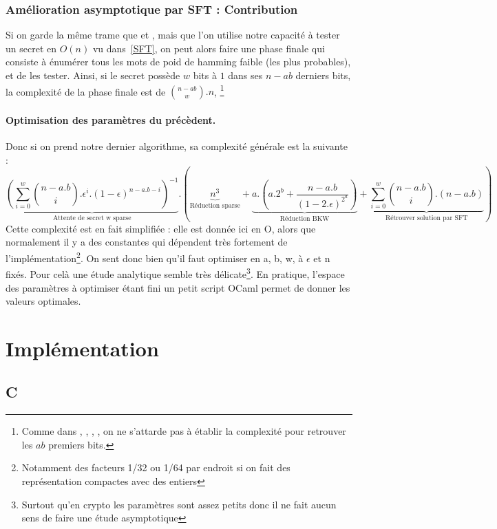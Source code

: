 \documentclass{article}		%
\theoremstyle{definition}
\theoremstyle{plain}
\begin{document}
\subsubsection{Amélioration asymptotique par SFT : Contribution}
\cite{Vaudenay}
Si on garde la même trame que \cite{Kirchner} et \cite{Bernstein}, mais que l'on utilise notre
capacité à tester un secret en $O(n)$ vu dans~\ref{SFT}, on peut alors faire une phase
finale qui consiste à énumérer tous les mots de poid de hamming faible (les plus
probables), et de les tester. Ainsi, si le secret possède $w$ bits à $1$
dans ses $n-ab$ derniers bits,
la complexité de la phase finale est de $\binom{n-ab}{w}.n$, \footnote{Comme dans
\cite{LF}, \cite{BKW}, \cite{Kirchner}, \cite{Bernstein}, on ne s'attarde
pas à établir la complexité pour retrouver les $ab$ premiers bits.}

\paragraph{Optimisation des paramètres du précèdent.}
Donc si on prend notre dernier algorithme, sa complexité générale est
la suivante :
$$\underbrace{(\sum_{i=0}^{w}\binom{n-a.b}{i}.\epsilon^i.(1-\epsilon)^{n-a.b-i})^{-1}}_{\text{Attente
de secret w sparse}}.
(\underbrace{n^3}_{\text{Réduction sparse}} +
\underbrace{a.(a.2^b+\frac{n-a.b}{(1-2.\epsilon)^{2^a}})
}_{\text{Réduction BKW}} + \underbrace{\sum_{i=0}^w \binom{n-a.b}{i}.(n-a.b)}_{\text{Rétrouver solution par SFT}} )$$ 
Cette complexité est en fait simplifiée : elle est donnée ici en O, alors
que normalement il y a des constantes qui dépendent très fortement de
l'implémentation\footnote{Notamment des facteurs 1/32 ou 1/64 par
endroit si on fait des représentation compactes avec des entiers}. On sent
donc bien qu'il faut optimiser en a, b, w, à $\epsilon$ et n fixés. Pour
celà une étude analytique semble très délicate\footnote{Surtout qu'en
crypto les paramètres sont assez petits donc il ne fait aucun sens de
faire une étude asymptotique}. En pratique, l'espace des paramètres à
optimiser étant fini un petit script OCaml permet de donner les valeurs
optimales. 
\section{Implémentation}
\subsection{C}
\end{document}
